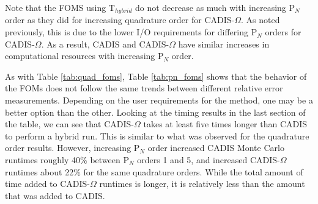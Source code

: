 Note that the FOMS using T$_{hybrid}$ do not decrease as much with increasing
P$_N$ order as they did for increasing quadrature order for CADIS-$\Omega$. As
noted previously, this is due to the lower I/O requirements for differing P$_N$
orders for CADIS-$\Omega$. As a result,
CADIS and CADIS-$\Omega$ have similar increases in computational
resources with increasing P$_N$ order.

As with Table \ref{tab:quad_foms}, Table \ref{tab:pn_foms} shows that the
behavior of the FOMs does not follow the same trends between different relative
error measurements. Depending on the user requirements for the method, one may
be a better option than the other. Looking at the timing results in the last
section of the table, we can see that CADIS-$\Omega$ takes at least five times
longer than CADIS to perform a hybrid run. This is similar to what was observed
for the quadrature order results. However, increasing P$_N$ order increased
CADIS Monte Carlo runtimes roughly 40\% between P$_N$ orders 1 and 5, and
increased CADIS-$\Omega$ runtimes about 22\% for the same quadrature orders.
While the total amount of time added to CADIS-$\Omega$ runtimes is longer, it is
relatively less than the amount that was added to CADIS.

